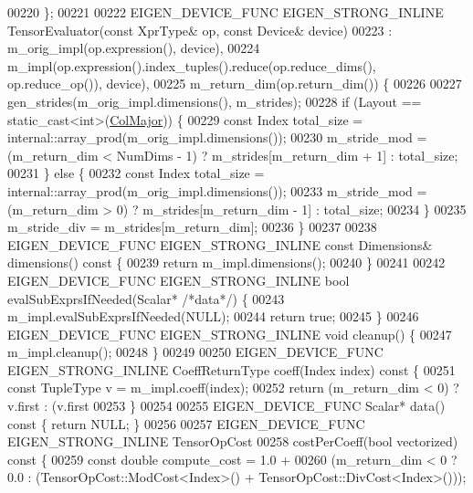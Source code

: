 \begin{DoxyCode}
00220   \};
00221 
00222   EIGEN\_DEVICE\_FUNC EIGEN\_STRONG\_INLINE TensorEvaluator(\textcolor{keyword}{const} XprType& op, \textcolor{keyword}{const} Device& device)
00223       : m\_orig\_impl(op.expression(), device),
00224         m\_impl(op.expression().index\_tuples().reduce(op.reduce\_dims(), op.reduce\_op()), device),
00225         m\_return\_dim(op.return\_dim()) \{
00226 
00227     gen\_strides(m\_orig\_impl.dimensions(), m\_strides);
00228     \textcolor{keywordflow}{if} (Layout == static\_cast<int>(\hyperlink{group__enums_ggaacded1a18ae58b0f554751f6cdf9eb13a0cbd4bdd0abcfc0224c5fcb5e4f6669a}{ColMajor})) \{
00229       \textcolor{keyword}{const} Index total\_size = internal::array\_prod(m\_orig\_impl.dimensions());
00230       m\_stride\_mod = (m\_return\_dim < NumDims - 1) ? m\_strides[m\_return\_dim + 1] : total\_size;
00231     \} \textcolor{keywordflow}{else} \{
00232       \textcolor{keyword}{const} Index total\_size = internal::array\_prod(m\_orig\_impl.dimensions());
00233       m\_stride\_mod = (m\_return\_dim > 0) ? m\_strides[m\_return\_dim - 1] : total\_size;
00234     \}
00235     m\_stride\_div = m\_strides[m\_return\_dim];
00236   \}
00237 
00238   EIGEN\_DEVICE\_FUNC EIGEN\_STRONG\_INLINE \textcolor{keyword}{const} Dimensions& dimensions()\textcolor{keyword}{ const }\{
00239     \textcolor{keywordflow}{return} m\_impl.dimensions();
00240   \}
00241 
00242   EIGEN\_DEVICE\_FUNC EIGEN\_STRONG\_INLINE \textcolor{keywordtype}{bool} evalSubExprsIfNeeded(Scalar* \textcolor{comment}{/*data*/}) \{
00243     m\_impl.evalSubExprsIfNeeded(NULL);
00244     \textcolor{keywordflow}{return} \textcolor{keyword}{true};
00245   \}
00246   EIGEN\_DEVICE\_FUNC EIGEN\_STRONG\_INLINE \textcolor{keywordtype}{void} cleanup() \{
00247     m\_impl.cleanup();
00248   \}
00249 
00250   EIGEN\_DEVICE\_FUNC EIGEN\_STRONG\_INLINE CoeffReturnType coeff(Index index)\textcolor{keyword}{ const }\{
00251     \textcolor{keyword}{const} TupleType v = m\_impl.coeff(index);
00252     \textcolor{keywordflow}{return} (m\_return\_dim < 0) ? v.first : (v.first %
00253   \}
00254 
00255   EIGEN\_DEVICE\_FUNC Scalar* data()\textcolor{keyword}{ const }\{ \textcolor{keywordflow}{return} NULL; \}
00256 
00257   EIGEN\_DEVICE\_FUNC EIGEN\_STRONG\_INLINE TensorOpCost
00258   costPerCoeff(\textcolor{keywordtype}{bool} vectorized)\textcolor{keyword}{ const }\{
00259     \textcolor{keyword}{const} \textcolor{keywordtype}{double} compute\_cost = 1.0 +
00260         (m\_return\_dim < 0 ? 0.0 : (TensorOpCost::ModCost<Index>() + TensorOpCost::DivCost<Index>()));

\end{DoxyCode}

